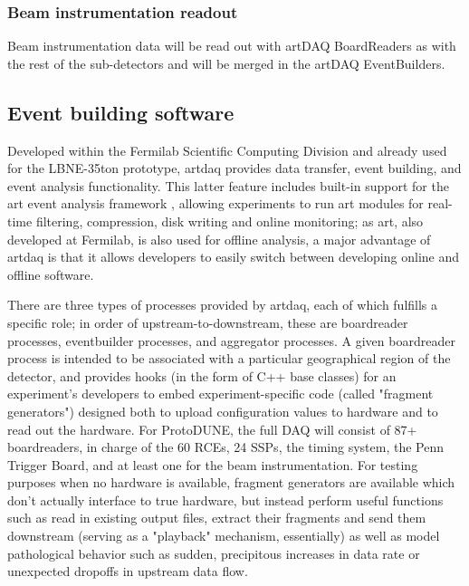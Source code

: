 \subsubsection{Beam instrumentation readout}

Beam instrumentation data will be read out with artDAQ BoardReaders as with 
the rest of the sub-detectors and will be merged in the artDAQ EventBuilders.

\subsection{Event building software }




Developed within the Fermilab Scientific Computing Division and
already used for the LBNE-35ton prototype, artdaq provides data
transfer, event building, and event analysis functionality. This
latter feature includes built-in support for the art event analysis
framework \cite{fnal:art}, allowing experiments to run art modules for real-time
filtering, compression, disk writing and online monitoring; as art,
also developed at Fermilab, is also used for offline analysis, a major
advantage of artdaq is that it allows developers to easily switch
between developing online and offline software.

There are three types of processes provided by artdaq, each of which
fulfills a specific role; in order of upstream-to-downstream, these
are boardreader processes, eventbuilder processes, and aggregator
processes. A given boardreader process is intended to be associated
with a particular geographical region of the detector, and provides
hooks (in the form of C++ base classes) for an experiment's developers
to embed experiment-specific code (called "fragment generators")
designed both to upload configuration values to hardware and to read
out the hardware. For ProtoDUNE, the full DAQ will consist of 87+ 
boardreaders, in charge of the 60 RCEs, 24 SSPs, the timing system, 
the Penn Trigger Board, and at least one for the beam instrumentation.
For testing purposes when
no hardware is available, fragment generators are available which
don't actually interface to true hardware, but instead perform useful
functions such as read in existing output files, extract their
fragments and send them downstream (serving as a "playback" mechanism,
essentially) as well as model pathological behavior such as sudden,
precipitous increases in data rate or unexpected dropoffs in upstream
data flow.

